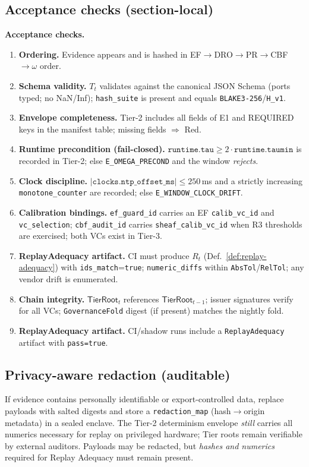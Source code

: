 \documentclass[10pt]{article}
\newenvironment{acceptchecks}{\par\medskip\noindent\textbf{Acceptance checks.}\begin{enumerate}[leftmargin=*]}{\end{enumerate}\medskip}
\newenvironment{acceptchecks}{\begin{mdframed}\textbf{Acceptance checks.}\begin{enumerate}[leftmargin=*]}{\end{enumerate}\end{mdframed}}
\begin{document}
\subsection*{Acceptance checks (section-local)}
\begin{acceptchecks}
  \item \textbf{Ordering.} Evidence appears and is hashed in EF$\rightarrow$DRO$\rightarrow$PR$\rightarrow$CBF$\rightarrow\omega$ order.
  \item \textbf{Schema validity.} $T_t$ validates against the canonical JSON Schema (ports typed; no NaN/Inf); \texttt{hash\_suite} is present and equals \texttt{BLAKE3-256}/\texttt{H\_v1}.
  \item \textbf{Envelope completeness.} Tier-2 includes all fields of E1 and REQUIRED keys in the manifest table; missing fields $\Rightarrow$ \textsf{Red}.
  \item \textbf{Runtime precondition (fail-closed).} $\texttt{runtime.tau}\ge 2\cdot\texttt{runtime.taumin}$ is recorded in Tier-2; else \texttt{E\_OMEGA\_PRECOND} and the window \emph{rejects}.
  \item \textbf{Clock discipline.} $|\texttt{clocks.ntp\_offset\_ms}|\le 250$\,ms and a strictly increasing \texttt{monotone\_counter} are recorded; else \texttt{E\_WINDOW\_CLOCK\_DRIFT}.
  \item \textbf{Calibration bindings.} \texttt{ef\_guard\_id} carries an EF \texttt{calib\_vc\_id} and \texttt{vc\_selection}; \texttt{cbf\_audit\_id} carries \texttt{sheaf\_calib\_vc\_id} when R3 thresholds are exercised; both VCs exist in Tier-3.
  \item \textbf{ReplayAdequacy artifact.} CI must produce $R_t$ (Def.~\ref{def:replay-adequacy}) with \texttt{ids\_match}=\texttt{true}; \texttt{numeric\_diffs} within \texttt{AbsTol}/\texttt{RelTol}; any vendor drift is enumerated.
  \item \textbf{Chain integrity.} $\mathsf{TierRoot}_t$ references $\mathsf{TierRoot}_{t-1}$; issuer signatures verify for all VCs; \texttt{GovernanceFold} digest (if present) matches the nightly fold.
  \item \textbf{ReplayAdequacy artifact.} CI/shadow runs include a \texttt{ReplayAdequacy} artifact with \texttt{pass=true}.
\end{acceptchecks}

\subsection*{Privacy-aware redaction (auditable)}
If evidence contains personally identifiable or export-controlled data, replace payloads with salted digests and store a
\texttt{redaction\_map} (hash$\rightarrow$origin metadata) in a sealed enclave. The Tier-2 determinism envelope \emph{still} carries
all numerics necessary for replay on privileged hardware; Tier roots remain verifiable by external auditors. Payloads may be redacted,
but \emph{hashes and numerics} required for Replay Adequacy must remain present.
\end{document}
